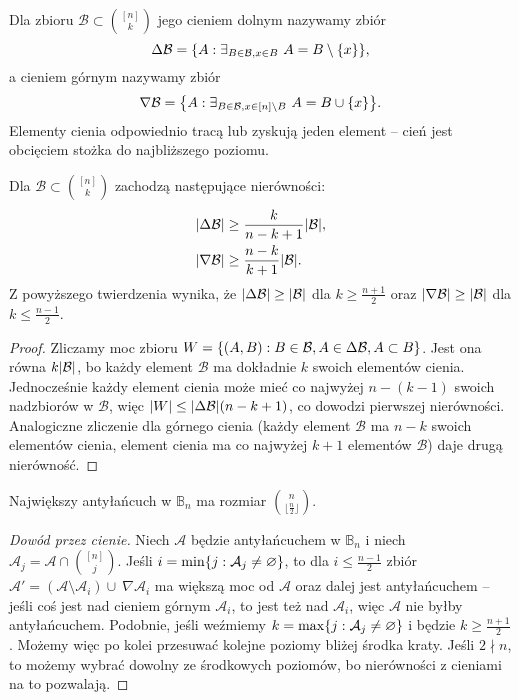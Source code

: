 \begin{definition}
	Dla zbioru \(\mathcal B \subset \displaystyle\binom{[n]}{k}\) jego cieniem
	dolnym nazywamy zbiór \[\Delta\mathcal B = \set{A : \exists_{B\in\mathcal B,
				x\in B} \ A=B\setminus\set{x}},\] a cieniem górnym nazywamy zbiór
	\[\nabla\mathcal B = \set{A : \exists_{B\in\mathcal B, x\in [n]\setminus B} \
			A=B\cup\set{x}}.\] Elementy cienia odpowiednio tracą lub zyskują jeden element
	-- cień jest obcięciem stożka do najbliższego poziomu.
\end{definition}

\begin{theorem}
	Dla \(\mathcal B \subset \displaystyle\binom{[n]}{k}\) zachodzą następujące nierówności:
	\begin{align*}
		\card{\Delta\mathcal B} & \ge \frac k{n-k+1}\card{\mathcal B},   \\
		\card{\nabla\mathcal B} & \ge \frac {n-k}{k+1}\card{\mathcal B}. \\
	\end{align*}
	Z powyższego twierdzenia wynika, że \(\card{\Delta\mathcal B} \ge \card{\mathcal B}\) dla \(k \ge
	\frac {n+1}2\) oraz \(\card{\nabla\mathcal B} \ge \card{\mathcal B}\) dla \(k \le \frac {n-1}2\).
\end{theorem}
\begin{proof}
	Zliczamy moc zbioru
	\(W = \set{(A,B) : B\in\mathcal B, A\in\Delta\mathcal B, A\subset B}\).
	Jest ona równa \(k\card{\mathcal B}\), bo każdy element \(\mathcal B\) ma dokładnie \(k\)
	swoich elementów cienia. Jednocześnie każdy element cienia może mieć co najwyżej
	\(n-(k-1)\) swoich nadzbiorów w \(\mathcal B\), więc \(\card W \le \card{\Delta\mathcal B}(n-k+1)\),
	co dowodzi pierwszej nierówności.
	Analogiczne zliczenie dla górnego cienia (każdy element \(\mathcal B\) ma \(n-k\)
	swoich elementów cienia, element cienia ma co najwyżej \(k+1\) elementów
	\(\mathcal B\)) daje drugą nierówność.
\end{proof}

\begin{theorem}
	Największy antyłańcuch w \(\mathbb B_n\) ma rozmiar \(\binom{n}{\lfloor \frac n2
		\rfloor}\).
\end{theorem}
\begin{proof}[Dowód przez cienie]
	Niech \(\mathcal A\) będzie antyłańcuchem w \(\mathbb B_n\) i niech \(\mathcal A_j
	= \mathcal A \cap \binom{[n]}{j}\). Jeśli \(i = \min\set{j : \mathcal
		A_j\ne\emptyset}\), to dla \(i\le \frac{n-1}2\) zbiór \(\mathcal A' = (\mathcal
	A\setminus \mathcal A_i)\cup \ \nabla\mathcal A_i\) ma większą moc od
	\(\mathcal{A}\) oraz dalej jest antyłańcuchem -- jeśli coś jest nad cieniem
	górnym \(\mathcal A_i\), to jest też nad \(\mathcal A_i\), więc \(\mathcal A\) nie
	byłby antyłańcuchem. Podobnie, jeśli weźmiemy \(k = \max\set{j : \mathcal
		A_j\ne\emptyset}\) i będzie \(k\ge \frac{n+1}2\). Możemy więc po kolei przesuwać
	kolejne poziomy bliżej środka kraty. Jeśli \(2\nmid n\), to możemy wybrać
	dowolny ze środkowych poziomów, bo nierówności z cieniami na to pozwalają.
\end{proof}

